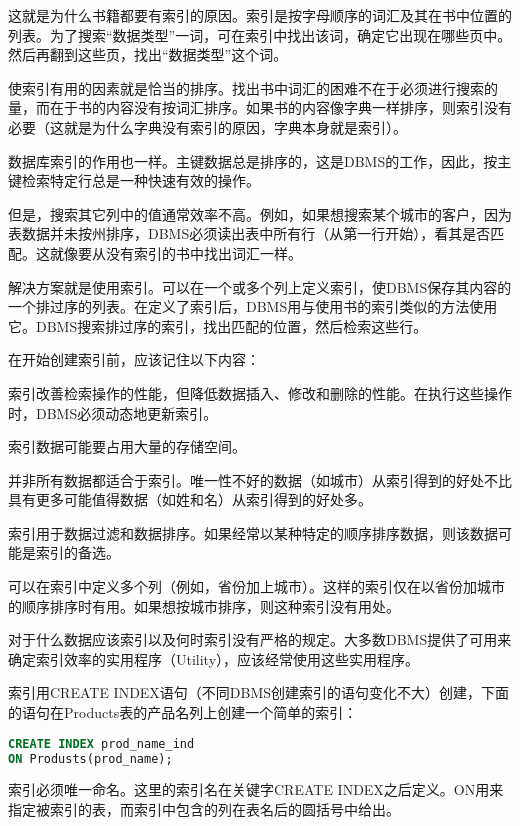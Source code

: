 这就是为什么书籍都要有索引的原因。索引是按字母顺序的词汇及其在书中位置的列表。为了搜索“数据类型”一词，可在索引中找出该词，确定它出现在哪些页中。然后再翻到这些页，找出“数据类型”这个词。

使索引有用的因素就是恰当的排序。找出书中词汇的困难不在于必须进行搜索的量，而在于书的内容没有按词汇排序。如果书的内容像字典一样排序，则索引没有必要（这就是为什么字典没有索引的原因，字典本身就是索引）。

数据库索引的作用也一样。主键数据总是排序的，这是DBMS的工作，因此，按主键检索特定行总是一种快速有效的操作。

但是，搜索其它列中的值通常效率不高。例如，如果想搜索某个城市的客户，因为表数据并未按州排序，DBMS必须读出表中所有行（从第一行开始），看其是否匹配。这就像要从没有索引的书中找出词汇一样。

解决方案就是使用索引。可以在一个或多个列上定义索引，使DBMS保存其内容的一个排过序的列表。在定义了索引后，DBMS用与使用书的索引类似的方法使用它。DBMS搜索排过序的索引，找出匹配的位置，然后检索这些行。

在开始创建索引前，应该记住以下内容：

\begin{compactitem}
\item 索引改善检索操作的性能，但降低数据插入、修改和删除的性能。在执行这些操作时，DBMS必须动态地更新索引。
\item 索引数据可能要占用大量的存储空间。
\item 并非所有数据都适合于索引。唯一性不好的数据（如城市）从索引得到的好处不比具有更多可能值得数据（如姓和名）从索引得到的好处多。
\item 索引用于数据过滤和数据排序。如果经常以某种特定的顺序排序数据，则该数据可能是索引的备选。
\item 可以在索引中定义多个列（例如，省份加上城市）。这样的索引仅在以省份加城市的顺序排序时有用。如果想按城市排序，则这种索引没有用处。
\end{compactitem}

对于什么数据应该索引以及何时索引没有严格的规定。大多数DBMS提供了可用来确定索引效率的实用程序（Utility），应该经常使用这些实用程序。

索引用CREATE INDEX语句（不同DBMS创建索引的语句变化不大）创建，下面的语句在Products表的产品名列上创建一个简单的索引：

\begin{lstlisting}[language=SQL]
CREATE INDEX prod_name_ind
ON Produsts(prod_name);
\end{lstlisting}

索引必须唯一命名。这里的索引名在关键字CREATE INDEX之后定义。ON用来指定被索引的表，而索引中包含的列在表名后的圆括号中给出。

